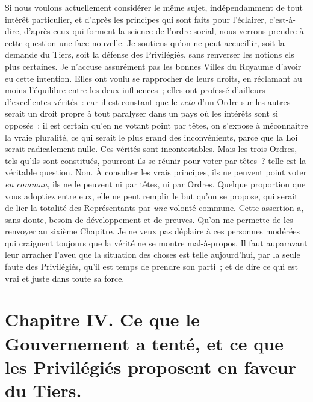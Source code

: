 \documentclass[french,twoside]{book} %
\newcommand\chapteropen{} %
\newcommand\chapterclose{} %
\begin{document}
Si nous voulons actuellement considérer le même sujet, indépendamment de tout intérêt particulier, et d’après les principes qui sont faits pour l’éclairer, c’est-à-dire, d’après ceux qui forment la science de l’ordre social, nous verrons prendre à cette question une face nouvelle. Je soutiens qu’on ne peut accueillir, soit la demande du Tiers, soit la défense des Privilégiés, sans renverser les notions els plus certaines. Je n’accuse assurément pas les bonnes Villes du Royaume d’avoir eu cette intention. Elles ont voulu se rapprocher de leurs droits, en réclamant au moins l’équilibre entre les deux influences ; elles ont professé d’ailleurs d’excellentes vérités : car il est constant que le {\itshape veto} d’un Ordre sur les autres serait un droit propre à tout paralyser dans un pays où les intérêts sont si opposés ; il est certain qu’en ne votant point par têtes, on s’expose à méconnaître la vraie pluralité, ce qui serait le plus grand des inconvénients, parce que la Loi serait radicalement nulle. Ces vérités sont incontestables. Mais les trois Ordres, tels qu’ils sont constitués, pourront-ils se réunir pour voter par têtes ? telle est la véritable question. Non. À consulter les vrais principes, ils ne peuvent point voter {\itshape en commun}, ils ne le peuvent ni par têtes, ni par Ordres. Quelque proportion que vous adoptiez entre eux, elle ne peut remplir le but qu’on se propose, qui serait de lier la totalité des Représentants par {\itshape une} volonté commune. Cette assertion a, sans doute, besoin de développement et de preuves. Qu’on me permette de les renvoyer au sixième Chapitre. Je ne veux pas déplaire à ces personnes modérées qui craignent toujours que la vérité ne se montre mal-à-propos. Il faut auparavant leur arracher l’aveu que la situation des choses est telle aujourd’hui, par la seule faute des Privilégiés, qu’il est temps de prendre son parti ; et de dire ce qui est vrai et juste dans toute sa force.\par
\par
  
\chapterclose


\chapteropen
\chapter[{Chapitre IV. Ce que le Gouvernement a tenté, et ce que les Privilégiés proposent en faveur du Tiers.}]{Chapitre IV. Ce que le Gouvernement a tenté, et ce que les Privilégiés proposent en faveur du Tiers.}\renewcommand{\leftmark}{Chapitre IV. Ce que le Gouvernement a tenté, et ce que les Privilégiés proposent en faveur du Tiers.}
\end{document}
